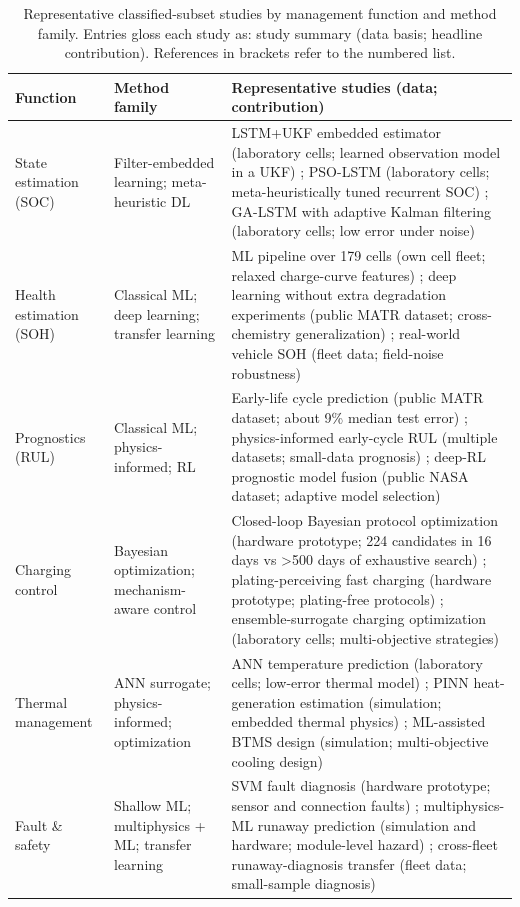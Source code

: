 \documentclass[journal]{IEEEtran}
\begin{document}
\begin{table}[!t]
\caption{Representative classified-subset studies by management function and method family. Entries gloss each study as: study summary (data basis; headline contribution). References in brackets refer to the numbered list.}
\label{tab:TABLE_REP}
\centering
\footnotesize
\begin{tabular}{|p{1.01in}|p{2.11in}|p{3.52in}|}
\hline
\textbf{Function} & \textbf{Method family} & \textbf{Representative studies (data; contribution)} \\
\hline
State estimation (SOC) & Filter-embedded learning; meta-heuristic DL & LSTM+UKF embedded estimator (laboratory cells; learned observation model in a UKF) \cite{r5}; PSO-LSTM (laboratory cells; meta-heuristically tuned recurrent SOC) \cite{r32}; GA-LSTM with adaptive Kalman filtering (laboratory cells; low error under noise) \cite{r41} \\
Health estimation (SOH) & Classical ML; deep learning; transfer learning & ML pipeline over 179 cells (own cell fleet; relaxed charge-curve features) \cite{r49}; deep learning without extra degradation experiments (public MATR dataset; cross-chemistry generalization) \cite{r54}; real-world vehicle SOH (fleet data; field-noise robustness) \cite{r6} \\
Prognostics (RUL) & Classical ML; physics-informed; RL & Early-life cycle prediction (public MATR dataset; about 9\% median test error) \cite{r3}; physics-informed early-cycle RUL (multiple datasets; small-data prognosis) \cite{r63}; deep-RL prognostic model fusion (public NASA dataset; adaptive model selection) \cite{r13} \\
Charging control & Bayesian optimization; mechanism-aware control & Closed-loop Bayesian protocol optimization (hardware prototype; 224 candidates in 16 days vs >500 days of exhaustive search) \cite{r4}; plating-perceiving fast charging (hardware prototype; plating-free protocols) \cite{r70}; ensemble-surrogate charging optimization (laboratory cells; multi-objective strategies) \cite{r71} \\
Thermal management & ANN surrogate; physics-informed; optimization & ANN temperature prediction (laboratory cells; low-error thermal model) \cite{r72}; PINN heat-generation estimation (simulation; embedded thermal physics) \cite{r9}; ML-assisted BTMS design (simulation; multi-objective cooling design) \cite{r73} \\
Fault \& safety & Shallow ML; multiphysics + ML; transfer learning & SVM fault diagnosis (hardware prototype; sensor and connection faults) \cite{r74}; multiphysics-ML runaway prediction (simulation and hardware; module-level hazard) \cite{r75}; cross-fleet runaway-diagnosis transfer (fleet data; small-sample diagnosis) \cite{r76} \\

\end{tabular}
\end{table}
\end{document}
